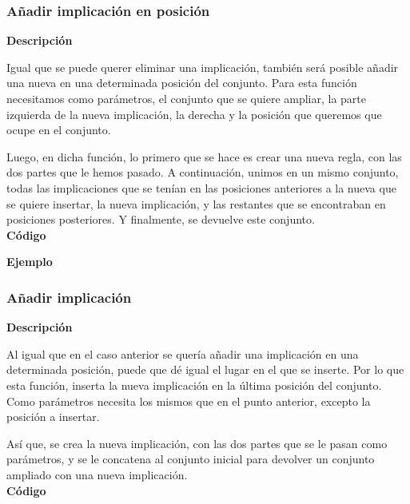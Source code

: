 \subsubsection{A\~nadir implicaci\'on en posici\'on}

    \textbf{Descripci\'on}

    Igual que se puede querer eliminar una implicaci\'on, tambi\'en ser\'a posible a\~nadir una nueva en una determinada posici\'on 
    del conjunto. Para esta funci\'on necesitamos como par\'ametros, el conjunto que se quiere ampliar, la parte izquierda de la nueva 
    implicaci\'on, la derecha y la posici\'on que queremos que ocupe en el conjunto.

    Luego, en dicha funci\'on, lo primero que se hace es crear una nueva regla, con las dos partes que le hemos pasado. A continuaci\'on, 
    unimos en un mismo conjunto, todas las implicaciones que se ten\'ian en las posiciones anteriores a la nueva que se quiere insertar, 
    la nueva implicaci\'on, y las restantes que se encontraban en posiciones posteriores. Y finalmente, se devuelve este conjunto.
    \\


    \textbf{C\'odigo}

    

    \textbf{Ejemplo}



\subsubsection{A\~nadir implicaci\'on}

    \textbf{Descripci\'on}

    Al igual que en el caso anterior se quer\'ia a\~nadir una implicaci\'on en una determinada posici\'on, puede que d\'e igual 
    el lugar en el que se inserte. Por lo que esta funci\'on, inserta la nueva implicaci\'on en la \'ultima posici\'on del 
    conjunto. Como par\'ametros necesita los mismos que en el punto anterior, excepto la posici\'on a insertar.

    As\'i que, se crea la nueva implicaci\'on, con las dos partes que se le pasan como par\'ametros, y se le concatena al conjunto 
    inicial para devolver un conjunto ampliado con una nueva implicaci\'on.
    \\


    \textbf{C\'odigo}

    


